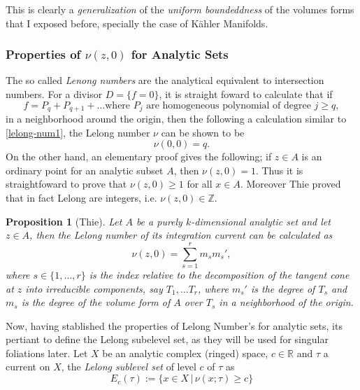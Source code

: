 \documentclass[12pt,twoside,a4paper]{report}
\newtheorem{prop}[theorem]{Proposition}
\newcommand{\zah}{\ensuremath{ \mathbb Z }}
\newcommand{\re}{\ensuremath{\mathbb R }}
\begin{document}
This is clearly a \emph{generalization} of the \emph{uniform boundeddness} of the volumes forms that I exposed before, specially the case of Kähler Manifolds.

\subsubsection{Properties of $\nu(z,0)$ for Analytic Sets}
The so called \emph{Lenong numbers} are the analytical equivalent to intersection numbers. For a divisor $D=\{f=0\}$, it is straight foward to calculate that if
\[
    f=P_q+P_{q+1}+\dots\text{where } P_j\text{ are homogeneous polynomial of degree }j\geq q,
\]
\noindent in a neighborhood around the origin, then the following a calculation similar to \ref{lelong-num1}, the Lelong number \(\nu\) can be shown to be
\[
    \nu(0,0)=q.
\]
On the other hand, an elementary proof gives the following; if $z\in A$ is an ordinary point for an analytic subset $A$, then $\nu(z,0)=1$. Thus it is straightfoward to prove that $\nu(z,0)\geq1$ for all $x\in A$. Moreover Thie proved that in fact Lelong are integers, i.e.  $\nu(z,0)\in\zah$.

\begin{prop}[Thie]\label{thie}
Let $A$ be a purely $k$-dimensional analytic set and let $z\in A$, then the Lelong number of its integration current can be calculated as
\[
    \nu(z,0)=\sum^{r}_{s=1}m_{s} m_{s}',
\]
\noindent where $s\in\{1,\dots,r\}$ is the index relative to the decomposition of the tangent cone at $z$ into irreducible components, say $T_1, \dots T_r$, where $m_s'$ is the degree of $T_s$ and $m_s$ is the degree of the volume form of $A$ over $T_s$ in a neighborhood of the origin.
\end{prop}

Now, having stablished the properties of Lelong Number's for analytic sets, its pertiant to define the Lelong subelevel set, as they will be used for singular foliations later. Let $X$ be an analytic complex (ringed) space, $c\in\re$ and $\tau$ a current on $X$, the \emph{Lelong sublevel set} of level $c$ of $\tau$ as
\begin{equation}
  E_c(\tau):=\{x\in X\,|\,\nu(x;\tau)\geq c\}
\end{equation}
\end{document}
